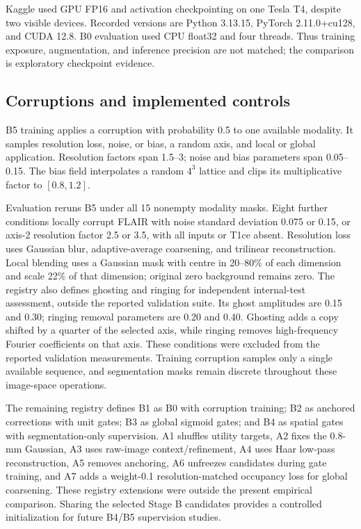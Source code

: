 \documentclass[conference]{IEEEtran}
\begin{document}
Kaggle used GPU FP16 and activation checkpointing on one Tesla T4, despite two visible devices. Recorded versions are Python 3.13.15, PyTorch 2.11.0+cu128, and CUDA 12.8. B0 evaluation used CPU float32 and four threads. Thus training exposure, augmentation, and inference precision are not matched; the comparison is exploratory checkpoint evidence.

\subsection{Corruptions and implemented controls}
B5 training applies a corruption with probability 0.5 to one available modality. It samples resolution loss, noise, or bias, a random axis, and local or global application. Resolution factors span 1.5--3; noise and bias parameters span 0.05--0.15. The bias field interpolates a random $4^3$ lattice and clips its multiplicative factor to $[0.8,1.2]$.

Evaluation reruns B5 under all 15 nonempty modality masks. Eight further conditions locally corrupt FLAIR with noise standard deviation 0.075 or 0.15, or axis-2 resolution factor 2.5 or 3.5, with all inputs or T1ce absent. Resolution loss uses Gaussian blur, adaptive-average coarsening, and trilinear reconstruction. Local blending uses a Gaussian mask with centre in 20--80\% of each dimension and scale 22\% of that dimension; original zero background remains zero. The registry also defines ghosting and ringing for independent internal-test assessment, outside the reported validation suite. Its ghost amplitudes are 0.15 and 0.30; ringing removal parameters are 0.20 and 0.40. Ghosting adds a copy shifted by a quarter of the selected axis, while ringing removes high-frequency Fourier coefficients on that axis. These conditions were excluded from the reported validation measurements. Training corruption samples only a single available sequence, and segmentation masks remain discrete throughout these image-space operations.

The remaining registry defines B1 as B0 with corruption training; B2 as anchored corrections with unit gates; B3 as global sigmoid gates; and B4 as spatial gates with segmentation-only supervision. A1 shuffles utility targets, A2 fixes the 0.8-mm Gaussian, A3 uses raw-image context/refinement, A4 uses Haar low-pass reconstruction, A5 removes anchoring, A6 unfreezes candidates during gate training, and A7 adds a weight-0.1 resolution-matched occupancy loss for global coarsening. These registry extensions were outside the present empirical comparison. Sharing the selected Stage B candidates provides a controlled initialization for future B4/B5 supervision studies.
\end{document}
